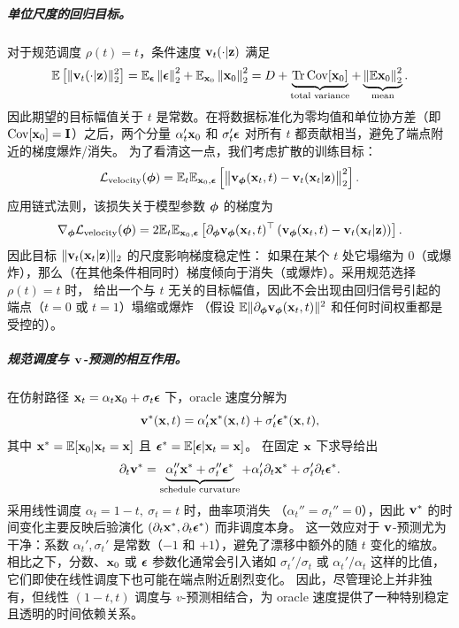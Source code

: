 \subparagraph{单位尺度的回归目标。}
对于规范调度 $\rho(t)=t$，条件速度 ${\mathbf{v}}_t(\cdot |{\mathbf{z}})$ 满足
\begin{align}\label{eq:unit-velocity}
\mathbb{E}\left[\|{\mathbf{v}}_t(\cdot |{\mathbf{z}})\|_2^2\right]
=\mathbb{E}_{{\bm{\epsilon}}}\left\lVert{\bm{\epsilon}}\right\rVert_2^2+\mathbb{E}_{{\mathbf{x}}_0}\left\lVert{\mathbf{x}}_0\right\rVert^2_2 = D + \underbrace{\operatorname{Tr}\mathrm{Cov}[{\mathbf{x}}_0]}_{\text{total variance}}+\underbrace{\left\lVert\mathbb{E}{\mathbf{x}}_0\right\rVert^2_2}_{\text{mean}}.
\end{align}
因此期望的目标幅值关于 $t$ 是常数。在将数据标准化为零均值和单位协方差（即 $\mathrm{Cov}[{\mathbf{x}}_0]={\mathbf{I}}$）之后，两个分量
$\alpha_t'{\mathbf{x}}_0$ 和 $\sigma_t'{\bm{\epsilon}}$ 对所有 $t$ 都贡献相当，避免了端点附近的梯度爆炸/消失。
为了看清这一点，我们考虑扩散的训练目标：
\[
\mathcal{L}_{\mathrm{velocity}}({\bm{\phi}})
= \mathbb{E}_{t}  \mathbb{E}_{{\mathbf{x}}_0,{\bm{\epsilon}}}\left[\big\|{\mathbf{v}}_{{\bm{\phi}}}({\mathbf{x}}_t,t) - {\mathbf{v}}_t({\mathbf{x}}_t|{\mathbf{z}})\big\|_2^2
\right].
\]
应用链式法则，该损失关于模型参数 ${\bm{\phi}}$ 的梯度为
\[
\nabla_{{\bm{\phi}}}\mathcal{L}_{\mathrm{velocity}}({\bm{\phi}})
= 2  \mathbb{E}_{t}  \mathbb{E}_{{\mathbf{x}}_0,{\bm{\epsilon}}} \left[
  \partial_{{\bm{\phi}}}{\mathbf{v}}_{{\bm{\phi}}}({\mathbf{x}}_t,t)^{\top} \left({\mathbf{v}}_{{\bm{\phi}}}({\mathbf{x}}_t,t) - {\mathbf{v}}_t({\mathbf{x}}_t|{\mathbf{z}})\right)
\right].
\]
因此目标 $\|{\mathbf{v}}_t({\mathbf{x}}_t|{\mathbf{z}})\|_2$ 的尺度影响梯度稳定性：
如果在某个 $t$ 处它塌缩为 $0$（或爆炸），那么（在其他条件相同时）梯度倾向于消失（或爆炸）。采用规范选择 $\rho(t)=t$ 时，
 给出一个与 $t$ 无关的目标幅值，因此不会出现由回归信号引起的端点（$t=0$ 或 $t=1$）塌缩或爆炸
（假设 $\mathbb{E}\|\partial_{{\bm{\phi}}}{\mathbf{v}}_{{\bm{\phi}}}({\mathbf{x}}_t,t)\|^2$ 和任何时间权重都是受控的）。


\subparagraph{规范调度与 ${\mathbf{v}}$-预测的相互作用。}
在仿射路径 ${\mathbf{x}}_t=\alpha_t {\mathbf{x}}_0+\sigma_t{\bm{\epsilon}}$ 下，oracle 速度分解为
\[
{\mathbf{v}}^*({\mathbf{x}}, t)=\alpha_t' {\mathbf{x}}^*({\mathbf{x}},t)+\sigma_t' {\bm{\epsilon}}^*({\mathbf{x}},t),
\]
其中 ${\mathbf{x}}^*=\mathbb{E}[{\mathbf{x}}_0|{\mathbf{x}}_t={\mathbf{x}}]$ 且 $ {\bm{\epsilon}}^*=\mathbb{E}[{\bm{\epsilon}}|{\mathbf{x}}_t={\mathbf{x}}]$。
在固定 ${\mathbf{x}}$ 下求导给出
\[
\partial_t {\mathbf{v}}^*
=\underbrace{\alpha_t'' {\mathbf{x}}^*+\sigma_t'' {\bm{\epsilon}}^*}_{\text{schedule curvature}}
+ \alpha_t' \partial_t {\mathbf{x}}^*+\sigma_t' \partial_t {\bm{\epsilon}}^*.
\]
采用线性调度 $\alpha_t=1-t,\ \sigma_t=t$ 时，曲率项消失
（$\alpha_t''=\sigma_t''=0$），因此 ${\mathbf{v}}^*$ 的时间变化主要反映后验演化 $(\partial_t {\mathbf{x}}^*,\partial_t {\bm{\epsilon}}^*)$ 而非调度本身。
这一效应对于 ${\mathbf{v}}$-预测尤为干净：系数 $\alpha_t',\sigma_t'$
是常数（$-1$ 和 $+1$），避免了漂移中额外的随 $t$ 变化的缩放。
相比之下，分数、${\mathbf{x}}_0$ 或 ${\bm{\epsilon}}$ 参数化通常会引入诸如
$\sigma_t'/\sigma_t$ 或 $\alpha_t'/\alpha_t$ 这样的比值，它们即使在线性调度下也可能在端点附近剧烈变化。
因此，尽管理论上并非独有，但线性 $(1-t,t)$ 调度与 $v$-预测相结合，为 oracle 速度提供了一种特别稳定且透明的时间依赖关系。

